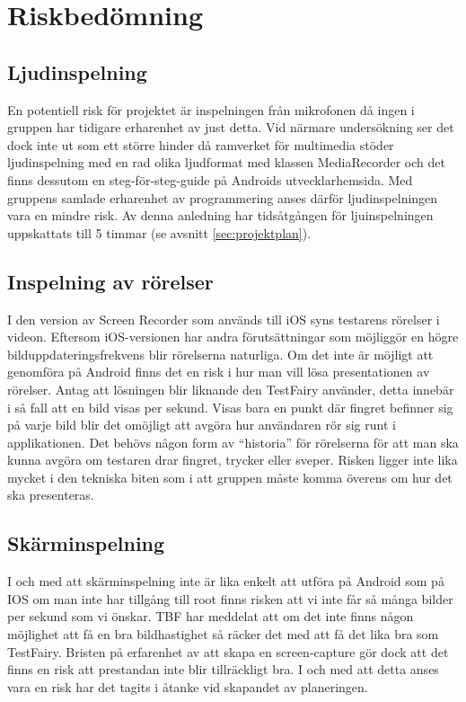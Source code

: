 \section{Riskbedömning}
\subsection{Ljudinspelning}
En potentiell risk för projektet är inspelningen från mikrofonen då ingen i gruppen har tidigare erharenhet av just detta. Vid närmare undersökning ser det dock inte ut som ett större hinder då ramverket för multimedia stöder ljudinspelning med en rad olika ljudformat med klassen MediaRecorder \parencite{sound} och det finns dessutom en steg-för-steg-guide på Androids utvecklarhemsida. Med gruppens samlade erharenhet av programmering anses därför ljudinspelningen vara en mindre risk. Av denna anledning har tidsåtgången för ljuinspelningen uppskattats till 5 timmar (se avsnitt \ref{sec:projektplan}).

\subsection{Inspelning av rörelser}
I den version av Screen Recorder som används till iOS syns testarens rörelser i videon. Eftersom iOS-versionen har andra förutsättningar som möjliggör en högre bilduppdateringsfrekvens blir rörelserna naturliga. Om det inte är möjligt att genomföra på Android finns det en risk i hur man vill lösa presentationen av rörelser. Antag att lösningen blir liknande den TestFairy använder, detta innebär i så fall att en bild visas per sekund. Visas bara en punkt där fingret befinner sig på varje bild blir det omöjligt att avgöra hur användaren rör sig runt i applikationen. Det behövs någon form av ``historia'' för rörelserna för att man ska kunna avgöra om testaren drar fingret, trycker eller sveper. Risken ligger inte lika mycket i den tekniska biten som i att gruppen måste komma överens om hur det ska presenteras.

\subsection{Skärminspelning}

I och med att skärminspelning inte är lika enkelt att utföra på Android som på IOS om man inte har tillgång till root finns risken att vi inte får så många bilder per sekund som vi önskar. TBF har meddelat att om det inte finns någon möjlighet att få en bra bildhastighet så räcker det med att få det lika bra som TestFairy. Bristen på erfarenhet av att skapa en screen-capture gör dock att det finns en risk att prestandan inte blir tillräckligt bra. I och med att detta anses vara en risk har det tagits i åtanke vid skapandet av planeringen.